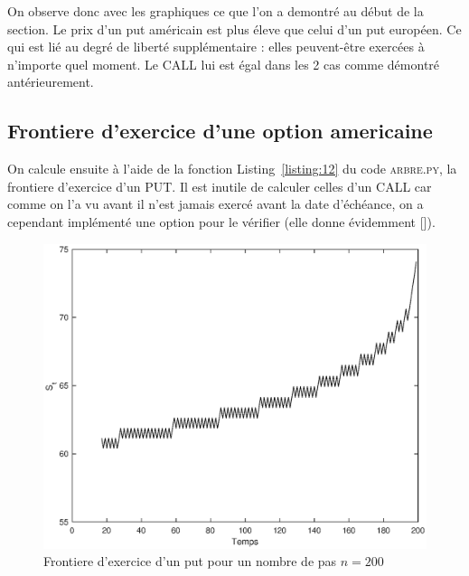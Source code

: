 On observe donc avec les graphiques ce que l'on a demontré au début de la section. Le prix d’un put américain est plus éleve que celui d'un put européen. Ce qui est lié au degré de liberté supplémentaire : elles peuvent-être exercées à n’importe quel moment. Le CALL lui est égal dans les 2 cas comme démontré antérieurement.

\subsection{Frontiere d'exercice d'une option americaine} %
\label{sub:frontiere_d_exercice_d_une_option_americaine}

On calcule ensuite à l'aide de la fonction Listing~\ref{listing:12} du code \textsc{arbre.py}, la frontiere d'exercice d'un PUT. Il est inutile de calculer celles d'un CALL car comme on l'a vu avant il n'est jamais exercé avant la date d'échéance, on a cependant implémenté une option pour le vérifier (elle donne évidemment \textsc{[]}).

\begin{figure}[H]
\centering
\includegraphics[scale=0.5]{./img/FRONTIERE_PUT.eps}
\caption{Frontiere d'exercice d'un put pour un nombre de pas $n=200$}
\label{fig:front_200}
\end{figure}

